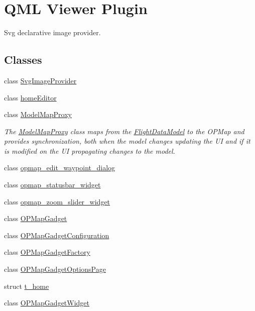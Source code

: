 \hypertarget{group___o_p_map_plugin}{\section{\-Q\-M\-L \-Viewer \-Plugin}
\label{group___o_p_map_plugin}
}


\-Svg declarative image provider.  


\subsection*{\-Classes}
\begin{DoxyCompactItemize}
\item 
class \hyperlink{class_svg_image_provider}{\-Svg\-Image\-Provider}
\item 
class \hyperlink{classhome_editor}{home\-Editor}
\item 
class \hyperlink{class_model_map_proxy}{\-Model\-Map\-Proxy}
\begin{DoxyCompactList}\small\item\em \-The \hyperlink{class_model_map_proxy}{\-Model\-Map\-Proxy} class maps from the \hyperlink{class_flight_data_model}{\-Flight\-Data\-Model} to the \-O\-P\-Map and provides synchronization, both when the model changes updating the \-U\-I and if it is modified on the \-U\-I propagating changes to the model. \end{DoxyCompactList}\item 
class \hyperlink{classopmap__edit__waypoint__dialog}{opmap\-\_\-edit\-\_\-waypoint\-\_\-dialog}
\item 
class \hyperlink{classopmap__statusbar__widget}{opmap\-\_\-statusbar\-\_\-widget}
\item 
class \hyperlink{classopmap__zoom__slider__widget}{opmap\-\_\-zoom\-\_\-slider\-\_\-widget}
\item 
class \hyperlink{class_o_p_map_gadget}{\-O\-P\-Map\-Gadget}
\item 
class \hyperlink{class_o_p_map_gadget_configuration}{\-O\-P\-Map\-Gadget\-Configuration}
\item 
class \hyperlink{class_o_p_map_gadget_factory}{\-O\-P\-Map\-Gadget\-Factory}
\item 
class \hyperlink{class_o_p_map_gadget_options_page}{\-O\-P\-Map\-Gadget\-Options\-Page}
\item 
struct \hyperlink{structt__home}{t\-\_\-home}
\item 
class \hyperlink{class_o_p_map_gadget_widget}{\-O\-P\-Map\-Gadget\-Widget}

\end{DoxyCompactItemize}
